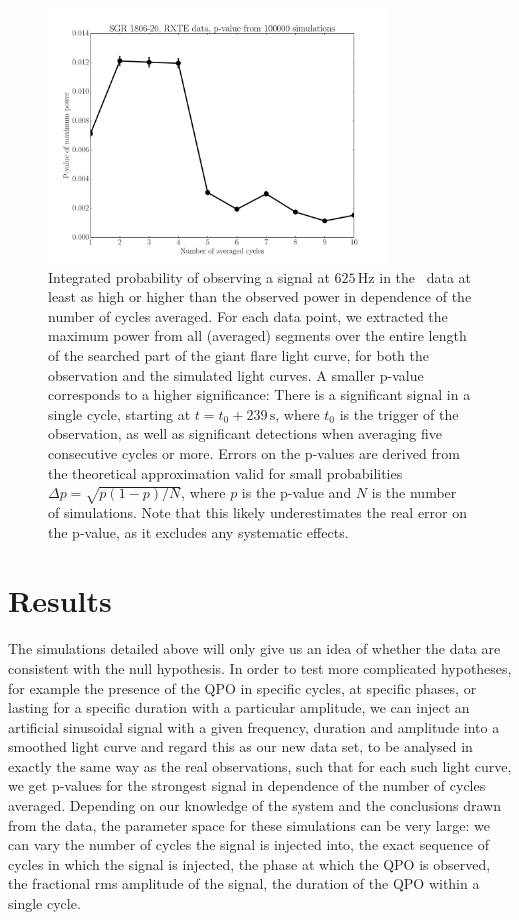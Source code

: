 \documentclass{emulateapj}
\begin{document}
\begin{figure}[htbp]
\begin{center}
\includegraphics[width=9cm]{f5.pdf}
\caption{Integrated probability of observing a signal at $625 \, \mathrm{Hz}$ in the \rxte\ data at least as high or higher than the observed power in dependence of the number of cycles averaged. For each data point, we extracted the maximum power from all (averaged) segments over the entire length of the searched part of the giant flare light curve, for both the observation and the simulated light curves. A smaller p-value corresponds to a higher significance: There is a significant signal in a single cycle, starting at $t = t_0 + 239 \, \mathrm{s}$, where $t_0$ is the trigger of the observation, as well as significant detections when averaging five consecutive cycles or more. Errors on the p-values are derived from the theoretical approximation valid for small probabilities $\Delta p = \sqrt{p (1-p)/N}$, where $p$ is the p-value and $N$ is the number of simulations. Note that this likely underestimates the real error on the p-value, as it excludes any systematic effects.}
\label{fig:rxte_pvals}
\end{center}
\end{figure}


\section{Results}
\label{sec:results}
The simulations detailed above will only give us an idea of whether the data are consistent with the null hypothesis. In order to test more complicated hypotheses, for example the presence of the QPO in specific cycles, at specific phases, or lasting for a specific duration with a particular amplitude, we can inject an artificial sinusoidal signal with a given frequency, duration and amplitude into a smoothed light curve and regard this as our new data set, to be analysed in exactly the same way as the real observations, such that for each such light curve, we get p-values for the strongest signal in dependence of the number of cycles averaged. Depending on our knowledge of the system and the conclusions drawn from the data, the parameter space for these simulations can be very large: we can vary the number of cycles the signal is injected into, the exact sequence of cycles in which the signal is injected, the phase at which the QPO is observed, the fractional rms amplitude of the signal, the duration of the QPO within a single cycle.
\end{document}
